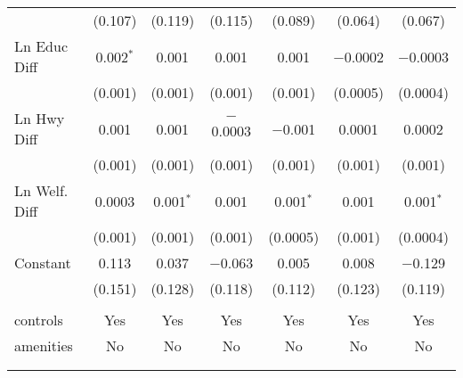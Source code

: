 \begin{table}[!htbp]
\begin{tabular}{@{\extracolsep{5pt}}lcccccc}
  & (0.107) & (0.119) & (0.115) & (0.089) & (0.064) & (0.067) \\ 
  Ln Educ Diff & 0.002$^{*}$ & 0.001 & 0.001 & 0.001 & $-$0.0002 & $-$0.0003 \\ 
  & (0.001) & (0.001) & (0.001) & (0.001) & (0.0005) & (0.0004) \\ 
  Ln Hwy Diff & 0.001 & 0.001 & $-$0.0003 & $-$0.001 & 0.0001 & 0.0002 \\ 
  & (0.001) & (0.001) & (0.001) & (0.001) & (0.001) & (0.001) \\ 
  Ln Welf. Diff & 0.0003 & 0.001$^{*}$ & 0.001 & 0.001$^{*}$ & 0.001 & 0.001$^{*}$ \\ 
  & (0.001) & (0.001) & (0.001) & (0.0005) & (0.001) & (0.0004) \\ 
  Constant & 0.113 & 0.037 & $-$0.063 & 0.005 & 0.008 & $-$0.129 \\ 
  & (0.151) & (0.128) & (0.118) & (0.112) & (0.123) & (0.119) \\ 
 \hline \\[-1.8ex] 
controls & Yes & Yes & Yes & Yes & Yes & Yes \\ 
amenities & No & No & No & No & No & No \\ 
\hline \\[-1.8ex] 
\hline 
\hline \\[-1.8ex] 
\end{tabular} 
\end{table} 
